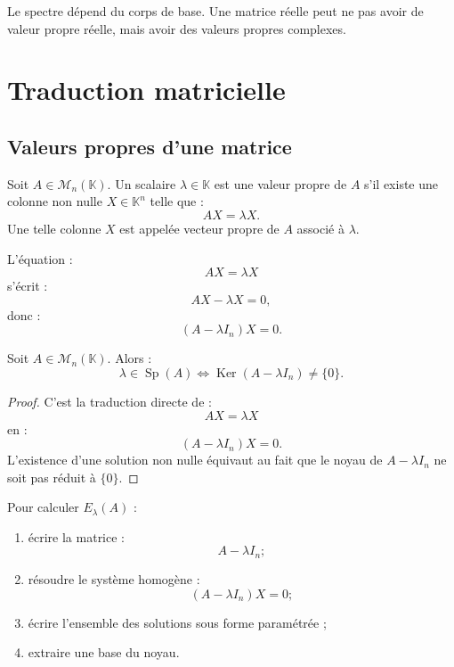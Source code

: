 \documentclass[11pt,a4paper]{article}
\newcommand{\K}{\mathbb K}
\newcommand{\M}{\mathcal M}
\newcommand{\Ker}{\operatorname{Ker}}
\newcommand{\Sp}{\operatorname{Sp}}
\begin{document}
\begin{erreurbox}
Le spectre dépend du corps de base.  
Une matrice réelle peut ne pas avoir de valeur propre réelle, mais avoir des valeurs propres complexes.
\end{erreurbox}

\section{Traduction matricielle}

\subsection{Valeurs propres d'une matrice}

\begin{definitionbox}
Soit \(A\in\M_n(\K)\).  
Un scalaire \(\lambda\in\K\) est une valeur propre de \(A\) s'il existe une colonne non nulle \(X\in\K^n\) telle que :
\[
AX=\lambda X.
\]
Une telle colonne \(X\) est appelée vecteur propre de \(A\) associé à \(\lambda\).
\end{definitionbox}

L'équation :
\[
AX=\lambda X
\]
s'écrit :
\[
AX-\lambda X=0,
\]
donc :
\[
(A-\lambda I_n)X=0.
\]

\begin{theorembox}
Soit \(A\in\M_n(\K)\).  
Alors :
\[
\lambda\in\Sp(A)
\Longleftrightarrow
\Ker(A-\lambda I_n)\neq\{0\}.
\]
\end{theorembox}

\begin{proof}
C'est la traduction directe de :
\[
AX=\lambda X
\]
en :
\[
(A-\lambda I_n)X=0.
\]
L'existence d'une solution non nulle équivaut au fait que le noyau de \(A-\lambda I_n\) ne soit pas réduit à \(\{0\}\).
\end{proof}

\begin{methodbox}
Pour calculer \(E_\lambda(A)\) :
\begin{enumerate}
    \item écrire la matrice :
    \[
    A-\lambda I_n ;
    \]
    \item résoudre le système homogène :
    \[
    (A-\lambda I_n)X=0 ;
    \]
    \item écrire l'ensemble des solutions sous forme paramétrée ;
    \item extraire une base du noyau.
\end{enumerate}
\end{methodbox}
\end{document}
